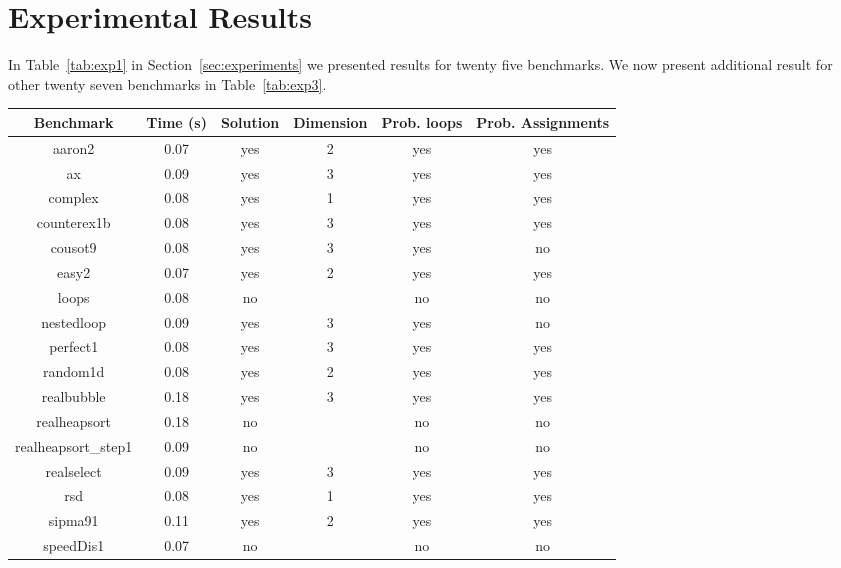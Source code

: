 
\section{Experimental Results}\label{sec:app_ex}
In Table~\ref{tab:exp1} in Section~\ref{sec:experiments} we presented results for twenty five benchmarks.
We now present additional result for other twenty seven benchmarks in Table~\ref{tab:exp3}.



\begin{center}
\begin{table}[]
  \centering
   \begin{tabular}{c|c|c|c|c|c}
    
   {Benchmark} & {Time (s)} & {Solution} & {Dimension} & {Prob. loops} & {Prob. Assignments
} \\\hline
{aaron2} & {0.07} & {yes} & {2} & {yes} & {yes
} \\\hline
{ax} & {0.09} & {yes} & {3} & {yes} & {yes
} \\\hline
{complex} & {0.08} & {yes} & {1} & {yes} & {yes
} \\\hline
{counterex1b} & {0.08} & {yes} & {3} & {yes} & {yes
} \\\hline
{cousot9} & {0.08} & {yes} & {3} & {yes} & {no
} \\\hline
{easy2} & {0.07} & {yes} & {2} & {yes} & {yes
} \\\hline
{loops} & {0.08} & {no} & {} & {no} & {no
} \\\hline
{nestedloop} & {0.09} & {yes} & {3} & {yes} & {no
} \\\hline
{perfect1} & {0.08} & {yes} & {3} & {yes} & {yes
} \\\hline
{random1d} & {0.08} & {yes} & {2} & {yes} & {yes
} \\\hline
{realbubble} & {0.18} & {yes} & {3} & {yes} & {yes
} \\\hline
{realheapsort} & {0.18} & {no} & {} & {no} & {no
} \\\hline
{realheapsort\_step1} & {0.09} & {no} & {} & {no} & {no
} \\\hline
{realselect} & {0.09} & {yes} & {3} & {yes} & {yes
} \\\hline
{rsd} & {0.08} & {yes} & {1} & {yes} & {yes
} \\\hline
{sipma91} & {0.11} & {yes} & {2} & {yes} & {yes
} \\\hline
{speedDis1} & {0.07} & {no} & {} & {no} & {no
} \\\hline

\end{tabular}
\end{table}
\end{center}
